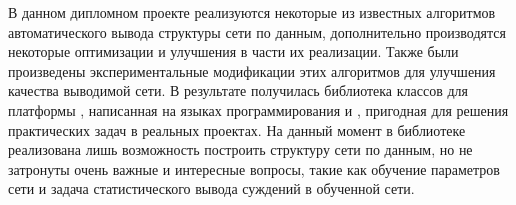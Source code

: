 В данном дипломном проекте реализуются некоторые из известных алгоритмов автоматического вывода структуры сети по данным, дополнительно производятся некоторые оптимизации и улучшения в части их реализации. 
Также были произведены экспериментальные модификации этих алгоритмов для улучшения качества выводимой сети. 
В результате получилась библиотека классов для платформы \dotnet{}, написанная на языках программирования \csharp{} и \fsharp{}, пригодная для решения практических задач в реальных проектах.
На данный момент в библиотеке реализована лишь возможность построить структуру сети по данным, но не затронуты очень важные и интересные вопросы, такие как обучение параметров сети и задача статистического вывода суждений в обученной сети.
